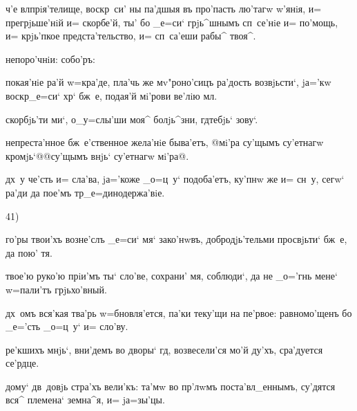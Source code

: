      ч'е 
вл прiя'телище, воскр~си' ны па'дшыя въ про'пасть 
лю'тагw w'янiя, и= прегрjьше'нiй и= скорбе'й, ты' бо 
_е=си` грjь^шнымъ сп~се'нiе и= по'мощь, и= крjь'пкое 
предста'тельство, и= сп~са'еши рабы^ твоя^.

  непоро'чнiи:    собо'ръ: 


 покая'нiе ра'й w=кра'де, пла'чь же 
мv"роно'сицъ ра'дость возвjьсти`, jа='кw воскр _е=си` 
хр` бж~е, подая'й мi'рови ве'лiю мл.


 скорбjь'ти ми`, о_у=слы'ши моя^ болjь^зни, 
гд тебjь` зову`.

 непреста'нное бж~е'ственное жела'нiе 
быва'етъ, @мi'ра су'щымъ су'етнагw кромjь`@{@су'щымъ 
внjь` су'етнагw мi'ра@}.

  дх~у че'сть и= сла'ва, jа='коже 
_о=ц~у` подоба'етъ, ку'пнw же и= сн~у, сегw` ра'ди да 
пое'мъ тр _е=динодержа'вiе.

   41)


 го'ры твои'хъ возне'слъ _е=си` мя` зако'нwвъ, 
добродjь'тельми просвjьти` бж~е, да пою' тя.

 твое'ю руко'ю прiи'мъ ты` сло'ве, сохрани' 
мя, соблюди`, да не _о='гнь мене` w=пали'тъ грjьхо'вный.

  дх~омъ вся'кая тва'рь w=бновля'ется, 
па'ки теку'щи на пе'рвое: равномо'щенъ бо _е='сть _о=ц~у` 
и= сло'ву.



 ре'кшихъ мнjь`, вни'демъ во дворы` гд, 
возвесели'ся мо'й ду'хъ, сра'дуется се'рдце.

 дому` дв~довjь стра'хъ вели'къ: та'мw во 
пр'лwмъ поста'вл_еннымъ, су'дятся вся^ племена` 
земна^я, и= jа=зы'цы.

